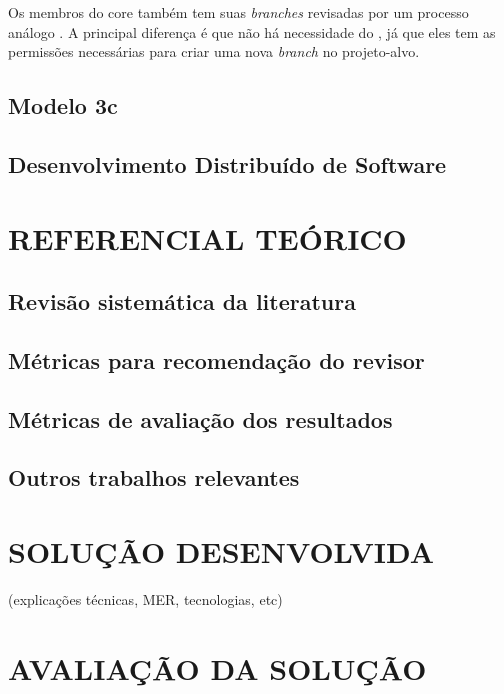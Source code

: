 \documentclass[preprint,12pt]{elsarticle}
\begin{document}
    Os membros do core também tem suas \textit{branches} revisadas por um processo análogo \cite{6385140,Bosu2014}. A principal diferença é que não há necessidade do , já que eles tem as permissões necessárias para criar uma nova \textit{branch} no projeto-alvo.

  \section{Modelo 3c}\label{sec:modelo_3c}

  \section{Desenvolvimento Distribuído de Software}\label{sec:dds}


\chapter{REFERENCIAL TEÓRICO}\label{chap:trabalhos_relacionados}

  \section{Revisão sistemática da literatura}\label{sec:revisao_sistematica}

  \section{Métricas para recomendação do revisor}\label{sec:metricas_revisor}

  \section{Métricas de avaliação dos resultados}\label{sec:metricas_resultados}

  \section{Outros trabalhos relevantes}\label{sec:outros_trabalhos}



\chapter{SOLUÇÃO DESENVOLVIDA}\label{chap:solucao}
    (explicações técnicas, MER, tecnologias, etc)

\chapter{AVALIAÇÃO DA SOLUÇÃO}\label{chap:resultados}
\end{document}
